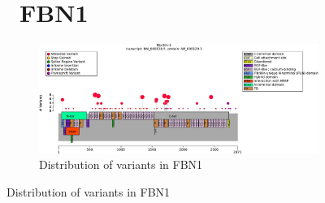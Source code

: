 \begin{figure}[htbp]
\section*{ FBN1}
\centering
\begin{subfigure}[b]{0.95\textwidth}
\centering
\includegraphics[width=\textwidth]{ img/FBN1_protein_diagram.pdf} 
\captionsetup{justification=raggedright,singlelinecheck=false}
\caption{Distribution of variants in FBN1}
\end{subfigure}



\end{figure}
